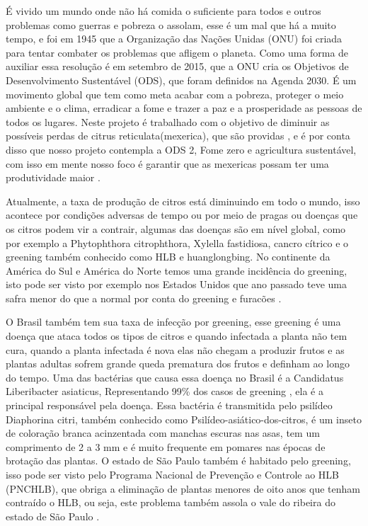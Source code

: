 É vivido um mundo onde não há comida o suficiente para todos e outros problemas como guerras e pobreza o assolam, esse é um mal que há a muito tempo, e foi em 1945 que a Organização das Nações Unidas (ONU) foi criada para tentar combater os problemas que afligem o planeta. Como uma forma de auxiliar essa resolução é em setembro de 2015, que a ONU cria os Objetivos de Desenvolvimento Sustentável (ODS), que foram definidos na Agenda 2030. É um movimento global que tem como meta acabar com a pobreza, proteger o meio ambiente e o clima, erradicar a fome e trazer a paz e a prosperidade as pessoas de todos os lugares. Neste projeto é trabalhado com o objetivo de diminuir as possíveis perdas de citrus reticulata(mexerica), que são providas , e é por conta disso que nosso projeto contempla a ODS 2, Fome zero e agricultura sustentável, com isso em mente nosso foco é garantir que as mexericas possam ter uma produtividade maior \cite{IntroduçãoGreening}.

Atualmente, a taxa de produção de citros está diminuindo em todo o mundo, isso acontece por condições adversas de tempo ou por meio de pragas ou doenças que os citros podem vir a contrair, algumas das doenças são em nível global, como por exemplo a Phytophthora citrophthora, Xylella fastidiosa, cancro cítrico e o greening também conhecido como HLB e huanglongbing. No continente da América do Sul e América do Norte temos uma grande incidência do greening, isto pode ser visto por exemplo nos Estados Unidos que ano passado teve uma safra menor do que a normal por conta do greening e furacões \cite{IntroduçãoEUAProblemas}.

O Brasil também tem sua taxa de infecção por greening, esse greening é uma doença que ataca todos os tipos de citros e quando infectada a planta não tem cura, quando a planta infectada é nova elas não chegam a produzir frutos e as plantas adultas sofrem grande queda prematura dos frutos e definham ao longo do tempo. Uma das bactérias que causa essa doença no Brasil é a Candidatus Liberibacter asiaticus, Representando 99\% dos casos de greening , ela é a principal responsável pela doença. Essa bactéria é transmitida pelo psilídeo Diaphorina citri, também conhecido como Psilídeo-asiático-dos-citros, é um inseto de coloração branca acinzentada com manchas escuras nas asas, tem um comprimento de 2 a 3 mm e é muito frequente em pomares nas épocas de brotação das plantas. O estado de São Paulo também é habitado pelo greening, isso pode ser visto pelo Programa Nacional de Prevenção e Controle ao HLB (PNCHLB), que obriga a eliminação de plantas menores de oito anos que tenham contraído o HLB, ou seja, este problema também assola o vale do ribeira do estado de São Paulo \cite{IntroduçãoGreening}.

